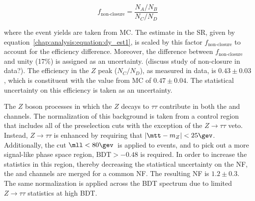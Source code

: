 \begin{equation}
f_{\textrm{non-closure}} = \frac{N_A/N_B}{N_C/N_D}
\label{chap:analysis:equation:abcd_nonclosure}
\end{equation}

\noindent
where the event yields are taken from \ZDY MC. The \ZDY estimate in
the SR, given by equation~\ref{chap:analysis:equation:dy_est1}, is
scaled by this factor $f_{\textrm{non-closure}}$ to account for the
\etmiss efficiency difference. Moreover, the difference between
$f_{\textrm{non-closure}}$ and unity (17\%) is assigned as an
uncertainty. (discuss study of non-closure in data?). The \etmiss
efficiency in the $Z$ peak ($N_C/N_D$), as measured in data, is $0.43
\pm 0.03$, which is constituent with the value from \ZDY MC of $0.47
\pm 0.04$. The statistical uncertainty on this efficiency is taken as
an uncertainty.

The $Z$ boson processes in which the $Z$ decays to $\tau\tau$
contribute in both the \emme and \eemm channels. The normalization of
this background is taken from a control region that includes all of
the preselection cuts with the exception of the
$Z\rightarrow{\tau\tau}$ veto. Instead, $Z\rightarrow{\tau\tau}$ is
enhanced by requiring that $|\mtt - m_Z| < 25 \gev$. Additionally, the
cut $\mll < 80 \gev$~is applied to \eemm events, and to pick out a
more signal-like phase space region, $\textrm{BDT} > -0.48$ is
required. In order to increase the statistics in this region, thereby
decreasing the statistical uncertainty on the NF, the \emme and \eemm
channels are merged for a common NF. The resulting NF is $1.2 \pm
0.3$. The same normalization is applied across the BDT spectrum due to
limited $Z\rightarrow{\tau\tau}$ statistics at high BDT. 
